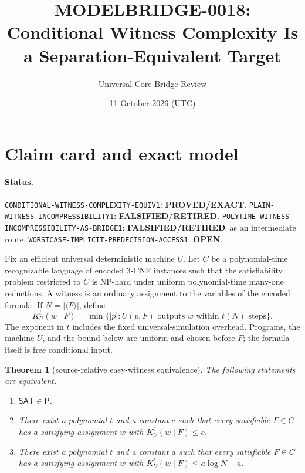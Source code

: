 \documentclass[11pt]{article}
\title{MODELBRIDGE-0018: Conditional Witness Complexity Is a Separation-Equivalent Target}
\author{Universal Core Bridge Review}
\date{11 October 2026 (UTC)}
\newtheorem{theorem}{Theorem}
\newcommand{\SAT}{\mathsf{SAT}}
\newcommand{\OPEN}{\textbf{OPEN}}
\newcommand{\EXACT}{\textbf{PROVED/EXACT}}
\newcommand{\RETIRED}{\textbf{FALSIFIED/RETIRED}}
\begin{document}
\maketitle

\begin{center}
\end{center}

\section{Claim card and exact model}

\paragraph{Status.}
\texttt{CONDITIONAL-WITNESS-COMPLEXITY-EQUIV1}: \EXACT.
\texttt{PLAIN-WITNESS-INCOMPRESSIBILITY1}: \RETIRED.
\texttt{POLYTIME-WITNESS-INCOMPRESSIBILITY-AS-BRIDGE1}: \RETIRED\ as an intermediate route.
\texttt{WORSTCASE-IMPLICIT-PREDECISION-ACCESS1}: \OPEN.

Fix an efficient universal deterministic machine $U$.  Let $C$ be a polynomial-time recognizable language of encoded $3$-CNF instances such that the satisfiability problem restricted to $C$ is NP-hard under uniform polynomial-time many-one reductions.  A witness is an ordinary assignment to the variables of the encoded formula.  If $N=|\langle F\rangle|$, define
\[
K_U^t(w\mid F)=\min\{|p|: U(p,F)\text{ outputs }w\text{ within }t(N)\text{ steps}\}.
\]
The exponent in $t$ includes the fixed universal-simulation overhead.  Programs, the machine $U$, and the bound below are uniform and chosen before $F$; the formula itself is free conditional input.

\begin{theorem}[source-relative easy-witness equivalence]
The following statements are equivalent.
\begin{enumerate}[label=(\roman*)]
\item $\SAT\in\mathsf P$.
\item There exist a polynomial $t$ and a constant $c$ such that every satisfiable $F\in C$ has a satisfying assignment $w$ with $K_U^t(w\mid F)\le c$.
\item There exist a polynomial $t$ and a constant $a$ such that every satisfiable $F\in C$ has a satisfying assignment $w$ with $K_U^t(w\mid F)\le a\log N+a$.
\end{enumerate}
\end{theorem}
\end{document}
